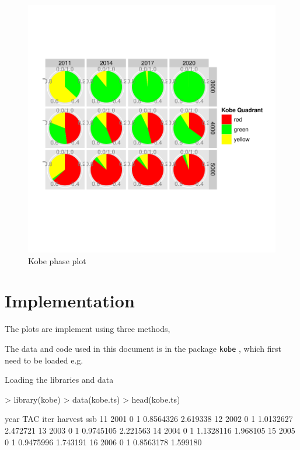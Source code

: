 \documentclass[a4paper, 11pt, oldtoc]{artikel1}
\begin{document}
\begin{figure}
\begin{center}
\includegraphics{kobe-008}
\caption{Kobe phase plot}
\end{center}
\end{figure}

\section{Implementation}



The plots are implement using three methods, 

The data and code used in this document is in the package {\tt kobe} , which first need to be loaded e.g.


Loading the libraries and data
\begin{Schunk}
\begin{Sinput}
> library(kobe)
> data(kobe.ts)
> head(kobe.ts)
\end{Sinput}
\begin{Soutput}
   year TAC iter   harvest      ssb
11 2001   0    1 0.8564326 2.619338
12 2002   0    1 1.0132627 2.472721
13 2003   0    1 0.9745105 2.221563
14 2004   0    1 1.1328116 1.968105
15 2005   0    1 0.9475996 1.743191
16 2006   0    1 0.8563178 1.599180
\end{Soutput}
\end{Schunk}
\end{document}
